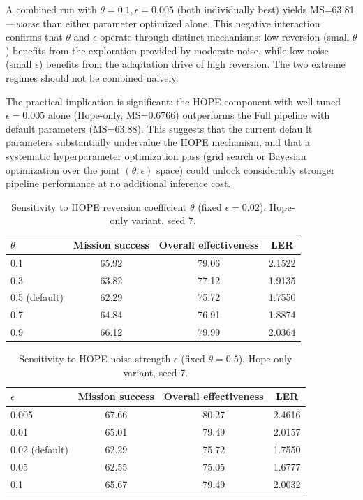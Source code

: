 A combined run with $\theta=0.1,\epsilon=0.005$ (both individually best) yields MS=63.81---\emph{worse} than either parameter optimized alone. This negative interaction confirms that $\theta$ and $\epsilon$ operate through distinct mechanisms: low reversion (small $\theta$) benefits from the exploration provided by moderate noise, while low noise (small $\epsilon$) benefits from the adaptation drive of high reversion. The two extreme regimes should not be combined naively.

The practical implication is significant: the HOPE component with well-tuned $\epsilon=0.005$ alone (Hope-only, MS=0.6766) outperforms the Full pipeline with default parameters (MS=63.88). This suggests that the current defau lt parameters substantially undervalue the HOPE mechanism, and that a systematic hyperparameter optimization pass (grid search or Bayesian optimization over the joint $(\theta,\epsilon)$ space) could unlock considerably stronger pipeline performance at no additional inference cost.

\begin{table}[ht]
\centering
\caption{Sensitivity to HOPE reversion coefficient $\theta$ (fixed $\epsilon=0.02$). Hope-only variant, seed 7.}
\label{tab:hyperparam-theta}
\small
\begin{tabular}{lccc}
\toprule
$\theta$ & Mission success & Overall effectiveness & LER \\
\midrule
0.1 & 65.92 & 79.06 & 2.1522 \\
0.3 & 63.82 & 77.12 & 1.9135 \\
0.5 (default) & 62.29 & 75.72 & 1.7550 \\
0.7 & 64.84 & 76.91 & 1.8874 \\
0.9 & 66.12 & 79.99 & 2.0364 \\
\bottomrule
\end{tabular}
\end{table}

\begin{table}[ht]
\centering
\caption{Sensitivity to HOPE noise strength $\epsilon$ (fixed $\theta=0.5$). Hope-only variant, seed 7.}
\label{tab:hyperparam-epsilon}
\small
\begin{tabular}{lccc}
\toprule
$\epsilon$ & Mission success & Overall effectiveness & LER \\
\midrule
0.005 & 67.66 & 80.27 & 2.4616 \\
0.01 & 65.01 & 79.49 & 2.0157 \\
0.02 (default) & 62.29 & 75.72 & 1.7550 \\
0.05 & 62.55 & 75.05 & 1.6777 \\
0.1 & 65.67 & 79.49 & 2.0032 \\
\bottomrule
\end{tabular}
\end{table}

